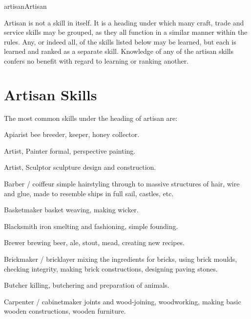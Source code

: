 \begin{Skill}[2.0]{artisan}{Artisan}

Artisan is not a skill in itself. It is a heading under which many
craft, trade and service skills may be grouped, as they all function
in a similar manner within the rules.  Any, or indeed all, of the
skills listed below may be learned, but each is learned and ranked as
a separate skill. Knowledge of any of the artisan skills confers no
benefit with regard to learning or ranking another.

\section{Artisan Skills}

The  most  common  skills  under  the  heading  of 
artisan are: 

\begin{Description}

\item[Apiarist] bee breeder, keeper, honey collector. 

\item[Artist, Painter] formal, perspective painting. 

\item[Artist, Sculptor] sculpture design and construction. 

\item[Barber / coiffeur] simple hairstyling through to massive
  structures of hair, wire and glue, made to resemble ships in full
  sail, castles, etc.

\item[Basketmaker] basket weaving, making wicker. 

\item[Blacksmith] iron smelting and fashioning, simple founding.

\item[Brewer] brewing beer, ale, stout, mead, creating new recipes.

\item[Brickmaker / bricklayer] mixing the ingredients for bricks,
  using brick moulds, checking integrity, making brick constructions,
  designing paving stones.

\item[Butcher] killing, butchering and preparation of animals.

\item[Carpenter / cabinetmaker] joints and wood-joining, woodworking,
  making basic wooden constructions, wooden furniture.


\end{Description}
\end{Skill}
